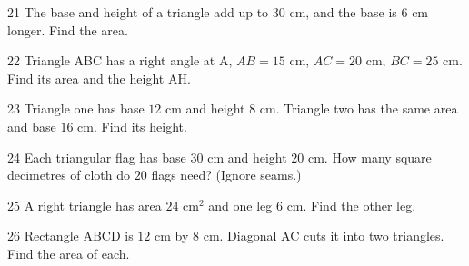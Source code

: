 \gap
\begin{probbox}{21}{\relax}
The base and height of a triangle add up to $30$ cm, and the base is $6$ cm longer. Find the area.
\end{probbox}
\gap
\begin{probbox}{22}{\relax}
Triangle ABC has a right angle at A, $AB=15$ cm, $AC=20$ cm, $BC=25$ cm. Find its area and the height AH.
\end{probbox}
\gap
\begin{probbox}{23}{\relax}
Triangle one has base $12$ cm and height $8$ cm. Triangle two has the same area and base $16$ cm. Find its height.
\end{probbox}
\gap
\begin{probbox}{24}{\relax}
Each triangular flag has base $30$ cm and height $20$ cm. How many square decimetres of cloth do $20$ flags need? (Ignore seams.)
\end{probbox}
\gap
\begin{probbox}{25}{\relax}
A right triangle has area $24$ cm$^2$ and one leg $6$ cm. Find the other leg.
\end{probbox}
\gap
\begin{probbox}{26}{\relax}
Rectangle ABCD is $12$ cm by $8$ cm. Diagonal AC cuts it into two triangles. Find the area of each.
\end{probbox}
